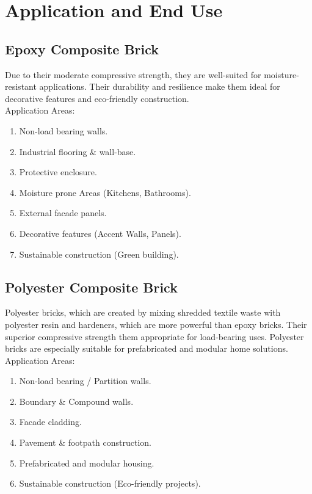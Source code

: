 \section{Application and End Use}

\subsection{Epoxy Composite Brick}
Due to their moderate compressive strength, they are well-suited for moisture-resistant applications. Their durability and resilience make them ideal for decorative features and eco-friendly construction. \\

\noindent Application Areas:
\begin{enumerate}
	\item Non-load bearing walls.
	\item Industrial flooring \& wall-base.
	\item Protective enclosure.
	\item Moisture prone Areas (Kitchens, Bathrooms).
	\item External facade panels.
	\item Decorative features (Accent Walls, Panels).
	\item Sustainable construction (Green building).
\end{enumerate}

\subsection{Polyester Composite Brick}
Polyester bricks, which are created by mixing shredded textile waste with polyester resin and hardeners, which are more powerful than epoxy bricks. Their superior compressive strength them appropriate for load-bearing uses. Polyester bricks are especially suitable for prefabricated and modular home solutions. \\

\noindent Application Areas:
\begin{enumerate}
	\item Non-load bearing / Partition walls.
	\item Boundary \& Compound walls.
	\item Facade cladding.
	\item Pavement \& footpath construction.
	\item Prefabricated and modular housing.
	\item Sustainable construction (Eco-friendly projects).
\end{enumerate}

